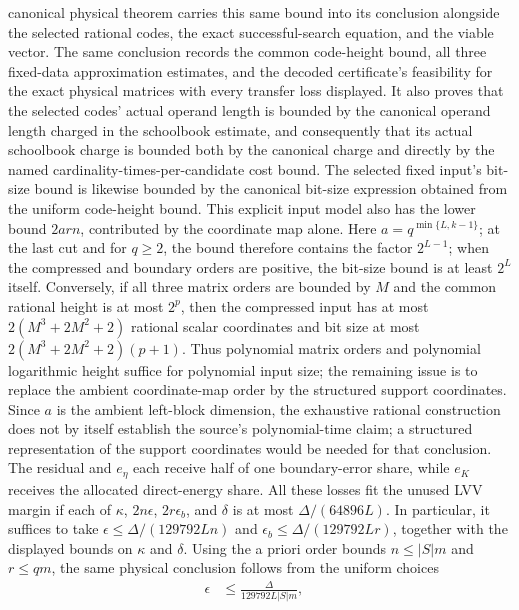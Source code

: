 \begin{lemma}
    canonical physical theorem carries this same bound into its conclusion
    alongside the selected rational codes, the exact successful-search
    equation, and the viable vector.  The same conclusion records the common
    code-height bound, all three fixed-data approximation estimates, and the
    decoded certificate's feasibility for the exact physical matrices with
    every transfer loss displayed.  It also proves that the selected codes'
    actual operand length is bounded by the canonical operand length charged
    in the schoolbook estimate, and consequently that its actual schoolbook
    charge is bounded both by the canonical charge and directly by the named
    cardinality-times-per-candidate cost bound.  The selected fixed input's
    bit-size bound is likewise bounded by the canonical bit-size expression
    obtained from the uniform code-height bound.
    This explicit input model also has the lower bound $2arn$, contributed by
    the coordinate map alone.  Here $a=q^{\min\{L,k-1\}}$; at the last cut and
    for $q\ge2$, the bound therefore contains the factor $2^{L-1}$; when the
    compressed and boundary orders are positive, the bit-size bound is at least
    $2^L$ itself.
    Conversely, if all three matrix orders are bounded by $M$ and the common
    rational height is at most $2^p$, then the compressed input has at most
    $2(M^3+2M^2+2)$ rational scalar coordinates and bit size at most
    $2(M^3+2M^2+2)(p+1)$.  Thus polynomial matrix orders and polynomial
    logarithmic height suffice for polynomial input size; the remaining issue
    is to replace the ambient coordinate-map order by the structured support
    coordinates.
    Since $a$ is the ambient left-block dimension,
    the exhaustive rational construction does not by itself establish the
    source's polynomial-time claim; a structured representation of the support
    coordinates would be needed for that conclusion.
    The residual and $e_\eta$
    each receive half of one boundary-error share, while $e_K$ receives the
    allocated direct-energy share.
    All these losses fit the unused LVV margin if each of
    $\kappa$, $2n\epsilon$, $2r\epsilon_b$, and $\delta$ is at most
    $\Delta/(64896L)$.
    In particular, it suffices to take
    $\epsilon\le\Delta/(129792Ln)$ and
    $\epsilon_b\le\Delta/(129792Lr)$, together with the displayed bounds
    on $\kappa$ and $\delta$.
    Using the a priori order bounds $n\le |S|m$ and $r\le qm$, the same
    physical conclusion follows from the uniform choices
    \begin{align*}
        \epsilon   & \le \frac{\Delta}{129792L|S|m}, &

\end{align*}
\end{lemma}
